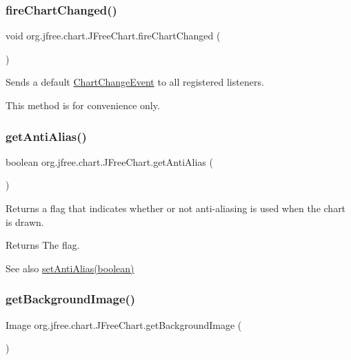 \subsubsection{\texorpdfstring{fire\+Chart\+Changed()}{fireChartChanged()}}
{\footnotesize\ttfamily void org.\+jfree.\+chart.\+J\+Free\+Chart.\+fire\+Chart\+Changed (\begin{DoxyParamCaption}{ }\end{DoxyParamCaption})}

Sends a default \mbox{\hyperlink{}{Chart\+Change\+Event}} to all registered listeners. 

This method is for convenience only. \mbox{\label{classorg_1_1jfree_1_1chart_1_1_j_free_chart_a78d60bae89b02c231f4417d4da838dfc}} 
\subsubsection{\texorpdfstring{get\+Anti\+Alias()}{getAntiAlias()}}
{\footnotesize\ttfamily boolean org.\+jfree.\+chart.\+J\+Free\+Chart.\+get\+Anti\+Alias (\begin{DoxyParamCaption}{ }\end{DoxyParamCaption})}

Returns a flag that indicates whether or not anti-\/aliasing is used when the chart is drawn.

\begin{DoxyReturn}{Returns}
The flag.
\end{DoxyReturn}
\begin{DoxySeeAlso}{See also}
\mbox{\hyperlink{classorg_1_1jfree_1_1chart_1_1_j_free_chart_a31e3f57a186d4183037230520e97fc9d}{set\+Anti\+Alias(boolean)}} 
\end{DoxySeeAlso}
\mbox{\label{classorg_1_1jfree_1_1chart_1_1_j_free_chart_a54597d54f86fd436c244870472e317be}} 
\subsubsection{\texorpdfstring{get\+Background\+Image()}{getBackgroundImage()}}
{\footnotesize\ttfamily Image org.\+jfree.\+chart.\+J\+Free\+Chart.\+get\+Background\+Image (\begin{DoxyParamCaption}{ }\end{DoxyParamCaption})}

